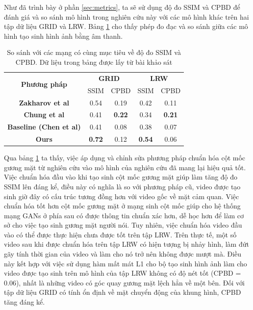 Như đã trình bày ở phần \ref{sec:metrics}, ta sẽ sử dụng độ đo SSIM và CPBD để đánh giá và so sánh mô hình trong nghiên cứu này với các mô hình khác trên hai tập dữ liệu GRID và LRW. Bảng \ref{table:metrics_result} cho thấy phép đo đạc và so sánh giữa các mô hình tạo sinh hình ảnh bằng âm thanh.

\begin{table}[h]
    \centering
    \begin{tabular}{c | c | c | c | c}
    \hline 
    \multirow{2}{*}{\textbf{Phương pháp}} & \multicolumn{2}{c|}{\textbf{GRID}} & \multicolumn{2}{c}{\textbf{LRW}}\\
    \cline{2-5}
    & SSIM & CPBD & SSIM & CPBD\\
    \hline
    \textbf{Zakharov et al \cite{zakharov}} & 0.54 & 0.19 & 0.42 & 0.11 \\
    \textbf{Chung et al \cite{chung}} & 0.41 & \textbf{0.22} & 0.34 & \textbf{0.21} \\
    \textbf{Baseline (Chen et al) \cite{chen2019}} & 0.41 & 0.08 & 0.38 & 0.07 \\
    \hline
    \hline
    \textbf{Ours} & \textbf{0.72} & 0.12 & \textbf{0.54} & 0.06 \\
    \hline
    \end{tabular}
    \caption{So sánh với các mạng có cùng mục tiêu về độ đo SSIM và CPBD. Dữ liệu trong bảng được lấy từ bài khảo sát \cite{chen_survey}}
    \label{table:metrics_result}
\end{table}

Qua bảng \ref{table:metrics_result} ta thấy, việc áp dụng và chỉnh sửa phương pháp chuẩn hóa cột mốc gương mặt từ nghiên cứu \cite{gen_face_landmark} vào mô hình của nghiên cứu \cite{chen2019} đã mang lại hiệu quả tốt. Việc chuẩn hóa đầu vào khi tạo sinh cột mốc gương mặt giúp làm tăng độ đo SSIM lên đáng kể, điều này có nghĩa là so với phương pháp cũ, video được tạo sinh giờ đây có cấu trúc tương đồng hơn với video gốc về mặt cảm quan. Việc chuẩn hóa tốt hơn cột mốc gương mặt ở mạng sinh cột mốc giúp cho hệ thống mạng GANs ở phía sau có được thông tin chuẩn xác hơn, dễ học hơn để làm cơ sở cho việc tạo sinh gương mặt người nói. Tuy nhiên, việc chuẩn hóa video đầu vào có thể được thực hiện chưa được tốt trên tập LRW. Trên thực tế, một số video sau khi được chuẩn hóa trên tập LRW có hiện tượng bị nhảy hình, làm đứt gãy tính thời gian của video và làm cho nó trở nên không được mượt mà. Điều này kết hợp với việc sử dụng hàm mất mát L1 cho bộ tạo sinh hình ảnh làm cho video được tạo sinh trên mô hình của tập LRW không có độ nét tốt (CPBD = 0.06), nhất là những video có góc quay gương mặt lệch hẳn về một bên. Đối với tập dữ liệu GRID có tính ổn định về mặt chuyển động của khung hình, CPBD tăng đáng kể.
